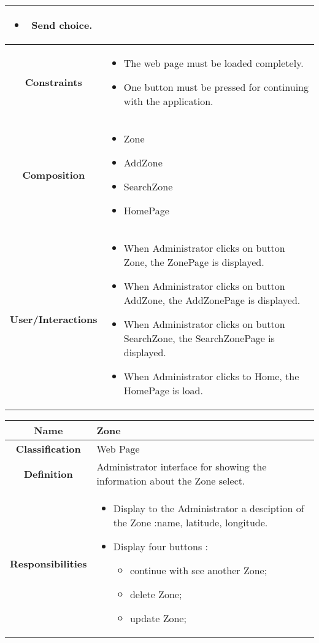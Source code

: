 \documentclass[11pt, a4paper,titlepage]{article}
\begin{document}
\begin{enumerate}
\begin{tabularx}{\textwidth}{| c | X |}
\begin{itemize}
		\item Send choice.
	\end{itemize}
	\\
	\hline
	\textbf{Constraints} &
	\begin{itemize}
		\item  The web page must be loaded completely.
		\item One button must be pressed for continuing with the application.
	\end{itemize}
	\\
	\hline
	\textbf{Composition} &
	\begin{itemize}
		\item Zone
		\item AddZone
		\item SearchZone
		\item HomePage
	\end{itemize}
	\\
	\hline
	\textbf{User/Interactions} &
	\begin{itemize}
		\item When Administrator clicks on button Zone, the ZonePage is displayed.
		\item When Administrator clicks on button AddZone, the AddZonePage is displayed.
		\item When Administrator clicks on button SearchZone, the SearchZonePage is displayed.
		\item When Administrator clicks to Home, the HomePage is load.
	\end{itemize}
	\\
	\hline 
\end{tabularx}
\begin{tabularx}{\textwidth}{| c | X |}
	\hline
	\textbf{Name} &
	Zone
	\\
	\hline
	\textbf{Classification} &
	Web Page
	\\
	\hline
	\textbf{Definition} &
	Administrator interface for showing the information about the Zone select.\\
	\hline
	\textbf{Responsibilities} &
	\begin{itemize}
		\item Display to the Administrator a desciption of the Zone :name, latitude, longitude.
		\item Display four buttons :
		\begin{itemize}
			\item continue with see another Zone;
			\item delete Zone;
			\item update Zone;

\end{itemize}
\end{itemize}
\end{tabularx}
\end{enumerate}
\end{document}
